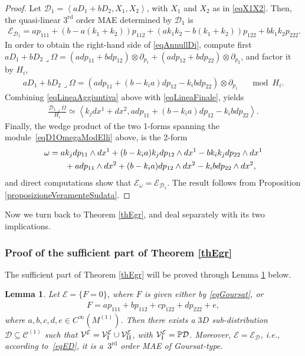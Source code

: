\documentclass[10pt,a4paper]{amsart}
\newcommand{\C}{\mathcal{C}}
\newcommand{\D}{\mathcal{D}}
\newcommand{\M}{\mathcal{V}}
\newcommand{\MM}{\mathcal{V}_{\textrm{\normalfont I}}}
\newcommand{\MMM}{\mathcal{V}_{\textrm{\normalfont II}}}
\newcommand{\E}{\mathcal{E}}
\newcommand{\Span}[1]{\left\langle #1 \right\rangle}
\renewcommand{\P}{\mathbb{P}}
\newcommand{\Rd}{^\textrm{rd}}
\newcommand{\elle}{H}
\numberwithin{equation}{section}
\newtheorem{Lemma}[Theorem]{Lemma}
\begin{document}
\begin{proof}
 Let
$\D_1=\Span{aD_1+bD_2, X_1,X_2}$,
with $X_1$ and $X_2$ as in \eqref{eqX1X2}. Then, the quasi-linear $3\Rd$ order MAE determined by $\D_1$ is
\begin{gather*}
\E_{\D_1}=ap_{111}+(b-a(k_1+k_2))p_{112}+(ak_1k_2-b(k_1+k_2))p_{122}+bk_1k_2p_{222}.
\end{gather*}
In order to obtain the right-hand side of \eqref{eqAnnullDi}, compute f\/irst
$
aD_1+bD_2\lrcorner \Omega = (adp_{11}+bdp_{12})\otimes \partial_{p_1}+(adp_{12}+bdp_{22})\otimes\partial_{p_2}
$,
and factor it by $\elle_i$,
\begin{gather}\label{eqLineaAggiuntiva}
aD_1+bD_2\lrcorner \Omega = (adp_{11}+(b-k_ia)dp_{12}-k_ib dp_{22})\otimes\partial_{p_1}\quad \mod \elle_i.
\end{gather}
Combining \eqref{eqLineaAggiuntiva} above with \eqref{eqLineaFinale}, yields
\begin{gather}\label{eqD1OmegaModElli}
{\frac{\D_1\lrcorner \Omega}{\elle_i}}\simeq\Span{k_jdx^1+dx^2, adp_{11}+(b-k_ia)dp_{12}-k_ib dp_{22}}.
\end{gather}
Finally, the wedge product of the two 1-forms spanning the module~\eqref{eqD1OmegaModElli} above, is the 2-form
\begin{gather*}
\omega= ak_jdp_{11}\wedge dx^1+(b-k_ia)k_jdp_{12}\wedge dx^1-bk_ik_jdp_{22}\wedge dx^1 \\
\hphantom{\omega=}{} + adp_{11}\wedge dx^2+(b-k_ia)dp_{12}\wedge dx^2-k_ibdp_{22}\wedge dx^2,
\end{gather*}
and direct computations show that
$
\E_\omega=\E_{\D_1}
$.
The result follows from Proposition \ref{proposizioneVeramenteSudata}.
\end{proof}

Now we turn back to Theorem \ref{thEgr}, and deal separately with its two implications.

\subsubsection{Proof of the suf\/f\/icient part of Theorem \ref{thEgr}}

The suf\/f\/icient part of Theorem \ref{thEgr} will be proved through Lemma \ref{LemQLsonoMonge} below.

\begin{Lemma}\label{LemQLsonoMonge}
 Let $\E=\{F=0\}$, where $F$ is given either by \eqref{eqGoursat},
 or
 \begin{gather}\label{eqGenQL}
F=ap_{111}+bp_{112}+cp_{122}+dp_{222}+e,
\end{gather}
where $a,b,c,d,e\in C^\infty(M^{(1)})$.
Then there exists a $3D$ sub-distribution $\D\subseteq\C^{(1)}$ such that $\M^\E=\MM^\E\cup\MMM^\E$, with $\MM^\E=\P\D$. Moreover, $\E=\E_\D$, i.e., according to~\eqref{eqED}, it is a~$3\Rd$ order MAE of Goursat-type.
\end{Lemma}
\end{document}
